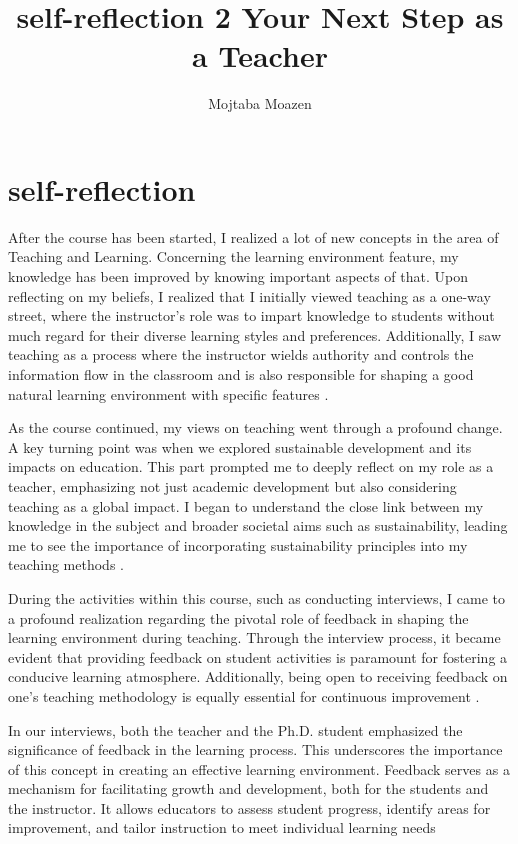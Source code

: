 \documentclass[12pt,a4paper]{article}
\title{self-reflection 2 Your Next Step as a Teacher}
\author{Mojtaba Moazen}
\begin{document}
\maketitle
\section{self-reflection}
After the course has been started, I realized a lot of new concepts in the area of Teaching and Learning. Concerning the learning environment feature, my knowledge has been improved by knowing important aspects of that. Upon reflecting on my beliefs, I realized that I initially viewed teaching as a one-way street, where the instructor's role was to impart knowledge to students without much regard for their diverse learning styles and preferences. Additionally, I saw teaching as a process where the instructor wields authority and controls the information flow in the classroom and is also responsible for shaping a good natural learning environment with specific features \cite{ain2011best}. 

As the course continued, my views on teaching went through a profound change. A key turning point was when we explored sustainable development and its impacts on education. This part prompted me to deeply reflect on my role as a teacher, emphasizing not just academic development but also considering teaching as a global impact. I began to understand the close link between my knowledge in the subject and broader societal aims such as sustainability, leading me to see the importance of incorporating sustainability principles into my teaching methods \cite{wiek2011key}.


During the activities within this course, such as conducting interviews, I came to a profound realization regarding the pivotal role of feedback in shaping the learning environment during teaching. Through the interview process, it became evident that providing feedback on student activities is paramount for fostering a conducive learning atmosphere. Additionally, being open to receiving feedback on one's teaching methodology is equally essential for continuous improvement \cite{timperley2007power}.

In our interviews, both the teacher and the Ph.D. student emphasized the significance of feedback in the learning process. This underscores the importance of this concept in creating an effective learning environment. Feedback serves as a mechanism for facilitating growth and development, both for the students and the instructor. It allows educators to assess student progress, identify areas for improvement, and tailor instruction to meet individual learning needs
\end{document}
